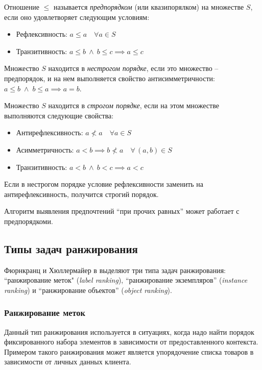 	\begin{definition}
	\label{def:preorder}
		Отношение $\leq$ называется \emph{предпорядком} (или квазипорялком) на множестве $S$, если оно удовлетворяет следующим условиям\cite{harel:2000}:
		\begin{itemize} 
			\item Рефлексивность: $a \leq a \quad \forall a \in S$
			\item Транзитивность: $a \leq b\: \wedge\: b \leq c \implies a \leq c$ 
		\end{itemize}
	\end{definition}	
	\begin{definition}
	\label{def:nonstrict_order}
		Множество $S$ находится в \emph{нестрогом порядке}, если это множество – предпорядок, и на нем выполняется свойство антисимметричности\cite{Skiena:1991}: $a \leq b\; \wedge\; b \leq a \implies a = b$.
	\end{definition}
	\begin{definition}
	\label{def:strict_order}
		Множество $S$ находится в \emph{строгом порядке}, если на этом множестве выполняются следующие свойства\cite{???}:
		\begin{itemize}
			\item Антирефлексивность: $ a \nless a \quad \forall a \in S$
			\item Асимметричность: $a < b \implies b \nless a \quad \forall \, (a, b) \in S$
			\item Транзитивность: $a < b\: \wedge\: b < c \implies a < c$
		\end{itemize}
		Если в нестрогом порядке условие рефлексивности заменить на антирефлексивность, получится строгий порядок.
	\end{definition}

	 Алгоритм выявления предпочтений \enquote{при прочих равных} может работает с предпорядкоми.

\subsection{Типы задач ранжирования}
	Фюрнкранц и Хюллермайер в \cite{plbook:Introduction:2010} выделяют три типа задач ранжирования: ``ранжирование меток" (\emph{label ranking}), ``ранжирование экземпляров'' (\emph{instance ranking}) и ``ранжирование объектов'' (\emph{object ranking}).
	
	\subsubsection{Ранжирование меток}
		Данный тип ранжирования используется в ситуациях, когда надо найти порядок фиксированного набора элементов в зависимости от предоставленного контекста. Примером такого ранжирования может является упорядочение списка товаров в зависимости от личных данных клиента.
	

